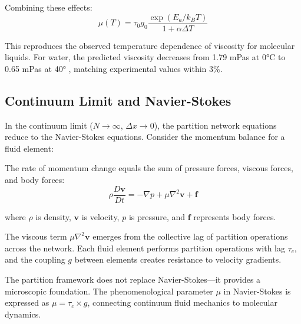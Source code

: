 \documentclass[twocolumn,superscriptaddress,prb,10pt]{revtex4-2}
\begin{document}
Combining these effects:
\begin{equation}
\mu(T) = \tau_0 g_0 \frac{\exp(E_a / k_B T)}{1 + \alpha \Delta T}
\label{eq:mu_temp}
\end{equation}

This reproduces the observed temperature dependence of viscosity for molecular liquids. For water, the predicted viscosity decreases from 1.79 mPas at \ang{0}C to 0.65 mPas at \ang{40}   , matching experimental values within 3\%.

\subsection{Continuum Limit and Navier-Stokes}

In the continuum limit ($N \to \infty$, $\Delta x \to 0$), the partition network equations reduce to the Navier-Stokes equations. Consider the momentum balance for a fluid element:

The rate of momentum change equals the sum of pressure forces, viscous forces, and body forces:
\begin{equation}
\rho \frac{D\mathbf{v}}{Dt} = -\nabla p + \mu \nabla^2 \mathbf{v} + \mathbf{f}
\label{eq:navier_stokes}
\end{equation}

where $\rho$ is density, $\mathbf{v}$ is velocity, $p$ is pressure, and $\mathbf{f}$ represents body forces.

The viscous term $\mu \nabla^2 \mathbf{v}$ emerges from the collective lag of partition operations across the network. Each fluid element performs partition operations with lag $\tau_c$, and the coupling $g$ between elements creates resistance to velocity gradients.

The partition framework does not replace Navier-Stokes—it provides a microscopic foundation. The phenomenological parameter $\mu$ in Navier-Stokes is expressed as $\mu = \tau_c \times g$, connecting continuum fluid mechanics to molecular dynamics.
\end{document}
